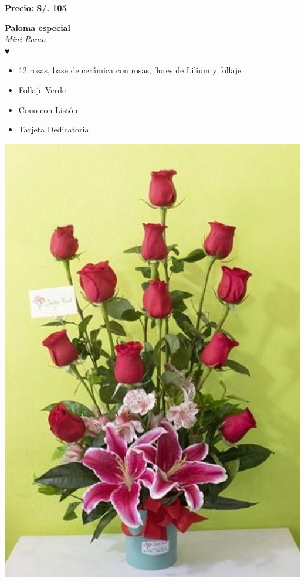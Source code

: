 \documentclass{article}
\begin{document}
\vspace{0.3cm}
\begin{center}
   \textbf{\Large Precio: \textcolor{cpred}{S/. 105 }}
\end{center}
\vspace{1cm}
\noindent
\begin{minipage}{0.6\textwidth}
    \textcolor{cpred}{\textbf{\huge Paloma especial }}\\
    {\textit{Mini Ramo}} \\
    \textcolor{cpred}{\Huge ♥} \\
    \vspace{0.5cm}
    \begin{itemize}
        \item 12 rosas, base de cerámica con rosas, flores de Lilium y follaje
        \item Follaje Verde
        \item Cono con Listón
        \item Tarjeta Dedicatoria
    \end{itemize}
\end{minipage}
\hspace{1cm}
\begin{minipage}{0.35\textwidth}
    \includegraphics[width=1.0\textwidth]{imagenes_extraidas/image_9_2}
\end{minipage}
\end{document}
